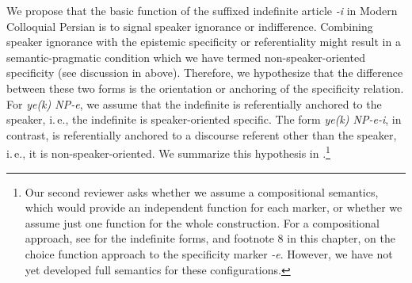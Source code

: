 \documentclass[output=paper]{langsci/langscibook}
\begin{document}
We propose that the basic function of the suffixed indefinite article {\emph{-i}} in Modern Colloquial Persian is to signal speaker ignorance or indifference. Combining speaker ignorance with the epistemic specificity or referentiality might result in a semantic-pragmatic condition which we have termed non-speaker-oriented specificity (see discussion in  above). Therefore, we hypothesize that the difference between these two forms is the orientation or anchoring of the specificity relation. For {\emph{ye(k) NP-e}}, we assume that the indefinite is referentially anchored to the speaker, i.\,e., the indefinite is speaker-oriented specific. The form {\emph{ye(k) NP-e-i}}, in contrast, is referentially anchored to a discourse referent other than the speaker, i.\,e., it is non-speaker-oriented. We summarize this hypothesis in .\footnote{Our second reviewer asks whether we assume a compositional semantics, which would provide an independent function for each marker, or whether we assume just one function for the whole construction. For a compositional approach, see \cite{jasbi:16} for the indefinite forms, and footnote 8 in this chapter, on the choice function approach to the specificity marker {\emph{-e}}. However, we have not yet developed full semantics for these configurations.}

\begin{table}

\caption{Specificity marker {\emph{-e}} with different indefinite markers in Modern Colloquial Persian}\label{4table:5}
\end{table}
\end{document}

